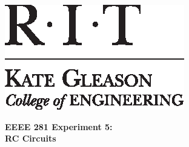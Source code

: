\documentclass[11pt]{article}
\begin{document}
	\hspace{6in}
		\includegraphics[scale=0.9,trim=0cm 0in 0in 0.0in,clip]{RIT_KGCOE1}
\newline

\Huge \textbf{EEEE 281 Experiment 5:\\ RC Circuits}\\
\end{document}

